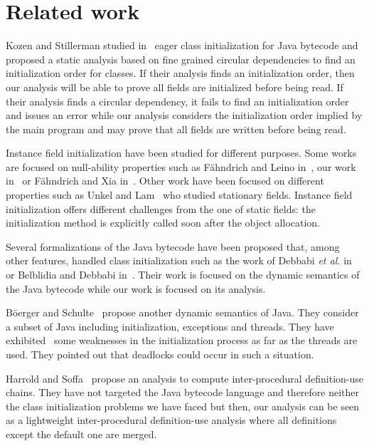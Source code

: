 \documentclass{entcs}
\begin{document}
\section{Related work}
\label{sec:related-work}

Kozen and Stillerman studied
in~\cite{kozen02:_eager_class_initial_for_java} eager class
initialization for Java bytecode and proposed a static analysis based
on fine grained circular dependencies to find an initialization order
for classes.  If their analysis finds an initialization order, then
our analysis will be able to prove all fields are initialized before
being read.  If their analysis finds a circular dependency, it fails
to find an initialization order and issues an error while our analysis
considers the initialization order implied by the main program and may
prove that all fields are written before being read.

Instance field initialization have been studied for different
purposes.  Some works are focused on null-ability properties such as
Fähndrich and Leino in~\cite{fahndrich03:_declar_and_check_non_null},
our work in~\cite{hubert08-1:nonnull_annotations_inference} or
Fähndrich and Xia
in~\cite{fahndrich07:object_invariants_delayed_types}.  Other work
have been focused on different properties such as Unkel and
Lam~\cite{unkel08:infererence_stationary_fields} who studied
stationary fields.  Instance field initialization offers different
challenges from the one of static fields: the initialization method is
explicitly called soon after the object allocation.

Several formalizations of the Java bytecode have been proposed that,
among other features, handled class initialization such as the work of
Debbabi \emph{et al.} in~\cite{FormalJVM} or Belblidia and Debbabi
in~\cite{FormalJVM2}.  Their work is focused on the dynamic semantics
of the Java bytecode while our work is focused on its analysis.

Böerger and Schulte~\cite{Borger98aprogrammer} propose another dynamic
semantics of Java.  They consider a subset of Java including
initialization, exceptions and threads.  They have
exhibited~\cite{borger00initialization} some weaknesses in the
initialization process as far as the threads are used.  They pointed
out that deadlocks could occur in such a situation.

Harrold and Soffa~\cite{harrold94:interprocedural_def_use} propose an
analysis to compute inter-procedural definition-use chains.  They have
not targeted the Java bytecode language and therefore neither the
class initialization problems we have faced but then, our analysis can
be seen as a lightweight inter-procedural definition-use analysis
where all definitions except the default one are merged.
\end{document}
